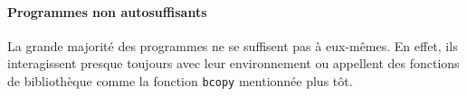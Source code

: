 






\paragraph{Programmes non autosuffisants}

La grande majorité des programmes ne se suffisent pas à eux-mêmes. En effet, ils
interagissent presque toujours avec leur environnement ou appellent des
fonctions de bibliothèque comme la fonction \texttt{bcopy} mentionnée plus tôt.

